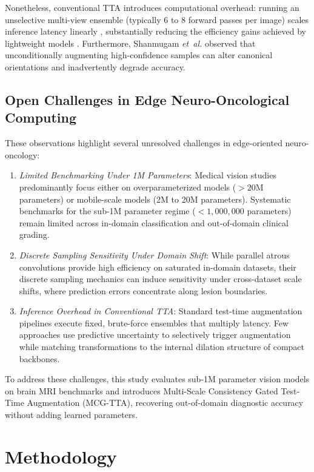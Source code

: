 \documentclass[journal]{IEEEtran}
\begin{document}
Nonetheless, conventional TTA introduces computational overhead: running an unselective multi-view ensemble (typically 6 to 8 forward passes per image) scales inference latency linearly \cite{42}, substantially reducing the efficiency gains achieved by lightweight models \cite{35, 42}. Furthermore, Shanmugam \emph{et~al.} \cite{42} observed that unconditionally augmenting high-confidence samples can alter canonical orientations and inadvertently degrade accuracy.

\subsection{Open Challenges in Edge Neuro-Oncological Computing}
These observations highlight several unresolved challenges in edge-oriented neuro-oncology:
\begin{enumerate}
\item \emph{Limited Benchmarking Under 1M Parameters}: Medical vision studies predominantly focus either on overparameterized models ($>20$M parameters) or mobile-scale models (2M to 20M parameters). Systematic benchmarks for the sub-1M parameter regime ($<1,000,000$ parameters) remain limited across in-domain classification and out-of-domain clinical grading.
\item \emph{Discrete Sampling Sensitivity Under Domain Shift}: While parallel atrous convolutions provide high efficiency on saturated in-domain datasets, their discrete sampling mechanics can induce sensitivity under cross-dataset scale shifts, where prediction errors concentrate along lesion boundaries.
\item \emph{Inference Overhead in Conventional TTA}: Standard test-time augmentation pipelines execute fixed, brute-force ensembles that multiply latency. Few approaches use predictive uncertainty to selectively trigger augmentation while matching transformations to the internal dilation structure of compact backbones.
\end{enumerate}

To address these challenges, this study evaluates sub-1M parameter vision models on brain MRI benchmarks and introduces Multi-Scale Consistency Gated Test-Time Augmentation (MCG-TTA), recovering out-of-domain diagnostic accuracy without adding learned parameters.



\section{Methodology}
\label{sec:methodology}
\end{document}
